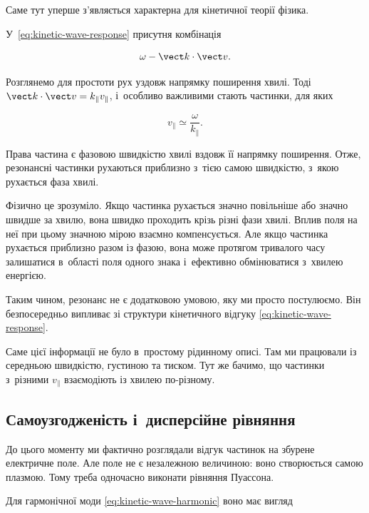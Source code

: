 Саме тут уперше з'являється характерна для кінетичної теорії фізика.

У~\eqref{eq:kinetic-wave-response} присутня комбінація

\begin{equation}\label{eq:kinetic-wave-resonance-denominator}
\omega-\vect k\cdot\vect v.
\end{equation}

Розглянемо для простоти рух уздовж напрямку поширення хвилі. Тоді
$\vect k\cdot\vect v=k_\parallel v_\parallel$, і~особливо важливими стають частинки,
для яких

\begin{equation}\label{eq:kinetic-wave-resonance}
v_\parallel\simeq\frac{\omega}{k_\parallel}.
\end{equation}

Права частина є фазовою швидкістю хвилі вздовж її напрямку поширення. Отже, резонансні
частинки рухаються приблизно з~тією самою швидкістю, з~якою рухається фаза хвилі.

Фізично це зрозуміло. Якщо частинка рухається значно повільніше або значно швидше за
хвилю, вона швидко проходить крізь різні фази хвилі. Вплив поля на неї при цьому
значною мірою взаємно компенсується. Але якщо частинка рухається приблизно разом
із фазою, вона може протягом тривалого часу залишатися в~області поля одного знака
і~ефективно обмінюватися з~хвилею енергією.

Таким чином, резонанс не є додатковою умовою, яку ми просто постулюємо. Він безпосередньо
випливає зі структури кінетичного відгуку \eqref{eq:kinetic-wave-response}.

Саме цієї інформації не було в~простому рідинному описі. Там ми працювали із середньою
швидкістю, густиною та тиском. Тут же бачимо, що частинки з~різними $v_\parallel$
взаємодіють із хвилею по-різному.

\subsection*{Самоузгодженість і~дисперсійне рівняння}

До цього моменту ми фактично розглядали відгук частинок на збурене електричне поле.
Але поле не є незалежною величиною: воно створюється самою плазмою. Тому треба одночасно
виконати рівняння Пуассона.

Для гармонічної моди \eqref{eq:kinetic-wave-harmonic} воно має вигляд

